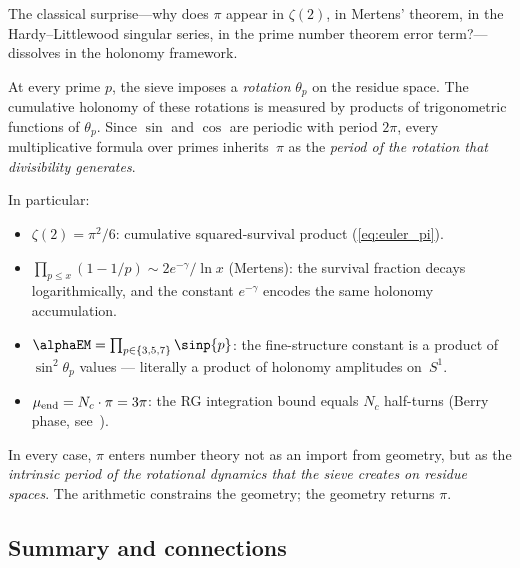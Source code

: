 \documentclass[12pt,a4paper]{article}
\begin{document}
\begin{remark}
\label{rem:why_pi_in_primes}
The classical surprise---why does $\pi$ appear in $\zeta(2)$, in
Mertens' theorem, in the Hardy--Littlewood singular series, in the
prime number theorem error term?---dissolves in the holonomy framework.

At every prime $p$, the sieve imposes a \emph{rotation} $\theta_p$
on the residue space. The cumulative holonomy of these rotations
is measured by products of trigonometric functions of $\theta_p$.
Since $\sin$ and $\cos$ are periodic with period $2\pi$, every
multiplicative formula over primes inherits~$\pi$ as the
\emph{period of the rotation that divisibility generates}.

In particular:
\begin{itemize}[nosep]
\item $\zeta(2) = \pi^2/6$: cumulative squared-survival product
  (\cref{eq:euler_pi}).
\item $\prod_{p \leq x}(1 - 1/p) \sim 2e^{-\gamma}/\ln x$
  (Mertens): the survival fraction decays logarithmically, and
  the constant $e^{-\gamma}$ encodes the same holonomy accumulation.
\item $\alphaEM = \prod_{p \in \{3,5,7\}} \sinp{p}$: the
  fine-structure constant is a product of $\sin^2\!\theta_p$ values
  --- literally a product of holonomy amplitudes on~$S^1$.
\item $\mu_{\rm end} = N_c \cdot \pi = 3\pi$: the RG integration
  bound equals $N_c$ half-turns (Berry phase, see~\cite{companion_physics}).
\end{itemize}

In every case, $\pi$ enters number theory not as an import from
geometry, but as the \emph{intrinsic period of the rotational
dynamics that the sieve creates on residue spaces}. The
arithmetic constrains the geometry; the geometry returns $\pi$.
\end{remark}

\subsection{Summary and connections}
\label{sec:ch6_summary}
\end{document}
